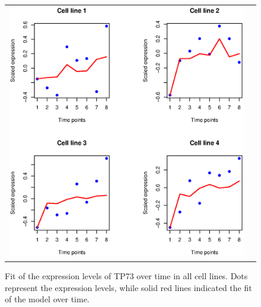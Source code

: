 \documentclass[a4paper]{article}
\begin{document}
\begin{figure}[h!]
\centering
\begin{tabular}{cc}
\includegraphics[scale=0.7]{fitTP73.eps}\\
\end{tabular}
\caption{Fit of the expression levels of TP73 over time in all cell lines. Dots represent the expression levels, while solid red lines indicated the fit of the model over time.}
\label{fig:fitTP73}
\end{figure}
\end{document}
